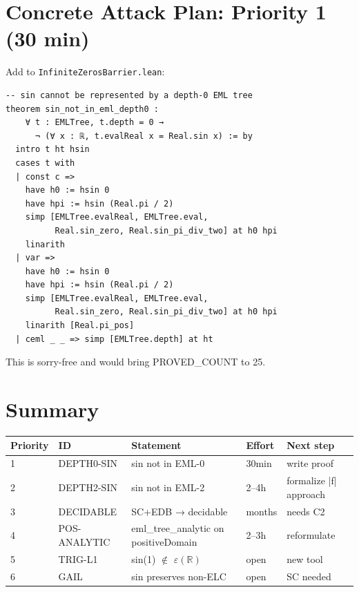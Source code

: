 \documentclass[12pt]{article}
\theoremstyle{definition}
\begin{document}
\section{Concrete Attack Plan: Priority 1 (30 min)}

Add to \texttt{InfiniteZerosBarrier.lean}:

\begin{verbatim}
-- sin cannot be represented by a depth-0 EML tree
theorem sin_not_in_eml_depth0 :
    ∀ t : EMLTree, t.depth = 0 →
      ¬ (∀ x : ℝ, t.evalReal x = Real.sin x) := by
  intro t ht hsin
  cases t with
  | const c =>
    have h0 := hsin 0
    have hpi := hsin (Real.pi / 2)
    simp [EMLTree.evalReal, EMLTree.eval,
          Real.sin_zero, Real.sin_pi_div_two] at h0 hpi
    linarith
  | var =>
    have h0 := hsin 0
    have hpi := hsin (Real.pi / 2)
    simp [EMLTree.evalReal, EMLTree.eval,
          Real.sin_zero, Real.sin_pi_div_two] at h0 hpi
    linarith [Real.pi_pos]
  | ceml _ _ => simp [EMLTree.depth] at ht
\end{verbatim}

This is sorry-free and would bring PROVED\_COUNT to 25.

\section{Summary}

\begin{center}
\begin{tabular}{lllll}
\toprule
Priority & ID & Statement & Effort & Next step \\
\midrule
1 & DEPTH0-SIN & sin not in EML-0 & 30min & write proof \\
2 & DEPTH2-SIN & sin not in EML-2 & 2–4h & formalize |f| approach \\
3 & DECIDABLE & SC+EDB → decidable & months & needs C2 \\
4 & POS-ANALYTIC & eml\_tree\_analytic on positiveDomain & 2–3h & reformulate \\
5 & TRIG-L1 & sin(1) $\notin$ $\varepsilon(\mathbb{R})$ & open & new tool \\
6 & GAIL & sin preserves non-ELC & open & SC needed \\
\bottomrule
\end{tabular}
\end{center}
\end{document}
